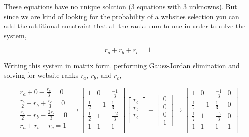 \documentclass[12pt]{article}
\begin{document}
These equations have no unique solution (3 equations with 3 unknowns). But since we are kind of looking for the probability of a websites selection you can add the additional constraint that all the ranks sum to one in order to solve the system,

\begin{equation}
	r_a + r_b + r_c = 1
\end{equation}

Writing this system in matrix form, performing Gauss-Jordan elimination and solving for website ranks $r_a, \, r_b, \, \text{and } r_c$, 

\iffalse
%
%
\begin{alignat*}{4}
r_a 			& {}+{} &  0 	& {}-{} 	& \frac{r_c}{3} 	& {}={} & 0 \\
\frac{r_a}{2}   & {}-{} &  r_b 	& {}+{} 	& \frac{r_c}{3} 	& {}={} & 0 \\
\frac{r_a}{2}   & {}+{} &  r_b 	& {}-{} 	& \frac{2 r_c}{3} 	& {}={} & 0 \\
r_a 			& {}+{} &  r_b 	& {}+{} 	& r_c 				& {}={} & 1
\end{alignat*}
\fi

\[
\begin{matrix} 
r_a 			+   0 		 - 	 \frac{r_c}{3} 		 = 0 \\
\frac{r_a}{2}   -   r_b 	 + 	 \frac{r_c}{3} 		 = 0 \\
\frac{r_a}{2}   +   r_b 	 - 	 \frac{2 r_c}{3} 	 = 0 \\
r_a 		 	+   r_b 	 + 	 r_c 				 = 1 \\
\end{matrix}
%
%
\rightarrow
%
%
\left[
\begin{array}{ccc}
1 			& 0 	& \frac{-1}{3} \\
\frac{1}{2} & -1 	& \frac{1}{3} \\
\frac{1}{2} & 1 	& \frac{-2}{3} \\
1 			& 1 	& 1 \\
\end{array}
\right]
%
\begin{bmatrix}
r_a \\ 
r_b \\
r_c \\
\end{bmatrix} 
=
\begin{bmatrix}
0 \\ 
0 \\
0 \\
1
\end{bmatrix} 
%
%
\rightarrow
%
%
\left[
\begin{array}{ccc|c}
1 			& 0 	& \frac{-1}{3} &  0 \\
\frac{1}{2} & -1 	& \frac{1}{3} &  0 \\
\frac{1}{2} & 1 	& \frac{-2}{3} &  0 \\
1 			& 1 	& 1 &  1 \\
\end{array}
\right]
\]
\end{document}
